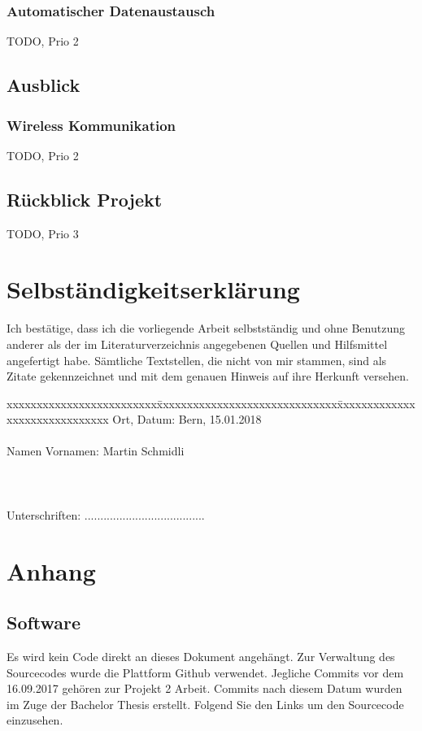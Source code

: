 \documentclass[11pt,english,german]{report}
\theoremstyle{definition}
\begin{document}
\subsection{Automatischer Datenaustausch}
TODO, Prio 2
\section{Ausblick}
\subsection{Wireless Kommunikation}
TODO, Prio 2
\section{Rückblick Projekt}
TODO, Prio 3

\chapter*{Selbständigkeitserklärung}
\label{chap:selbstaendigkeitserklaerung}

\vspace*{10mm} 

Ich bestätige, dass ich die vorliegende Arbeit selbstständig und ohne Benutzung anderer als der im Literaturverzeichnis angegebenen Quellen und Hilfsmittel angefertigt habe. Sämtliche Textstellen, die nicht von mir stammen, sind als Zitate gekennzeichnet und mit dem genauen Hinweis auf ihre Herkunft versehen. 

\vspace{15mm}

\begin{tabbing}
xxxxxxxxxxxxxxxxxxxxxxxxx\=xxxxxxxxxxxxxxxxxxxxxxxxxxxxxx\=xxxxxxxxxxxxxxxxxxxxxxxxxxxxxx\kill
Ort, Datum:\> Bern, 15.01.2018 \\ \\
Namen Vornamen:\> Martin Schmidli  \\ \\ \\ \\ 
Unterschriften:\> ...................................... \\
\end{tabbing}

\chapter*{Anhang}
\section{Software}
Es wird kein Code direkt an dieses Dokument angehängt. Zur Verwaltung des Sourcecodes wurde die Plattform Github verwendet. Jegliche Commits vor dem 16.09.2017 gehören zur Projekt 2 Arbeit. Commits nach diesem Datum wurden im Zuge der Bachelor Thesis erstellt. 
Folgend Sie den Links um den Sourcecode einzusehen.
\end{document}
